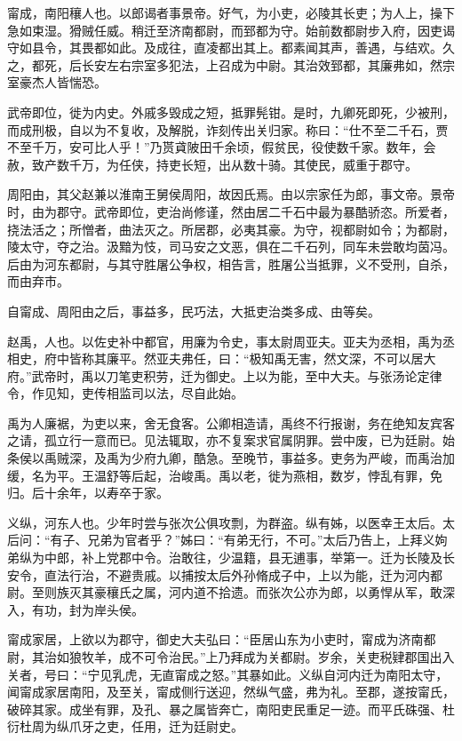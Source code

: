\documentclass[12pt,UTF8]{ctexbook}
\begin{document}
甯成，南阳穰人也。以郎谒者事景帝。好气，为小吏，必陵其长吏；为人上，操下急如束湿。猾贼任威。稍迁至济南都尉，而郅都为守。始前数都尉步入府，因吏谒守如县令，其畏都如此。及成往，直凌都出其上。都素闻其声，善遇，与结欢。久之，都死，后长安左右宗室多犯法，上召成为中尉。其治效郅都，其廉弗如，然宗室豪杰人皆惴恐。



武帝即位，徙为内史。外戚多毁成之短，抵罪髡钳。是时，九卿死即死，少被刑，而成刑极，自以为不复收，及解脱，诈刻传出关归家。称曰：“仕不至二千石，贾不至千万，安可比人乎！”乃贳貣陂田千余顷，假贫民，役使数千家。数年，会赦，致产数千万，为任侠，持吏长短，出从数十骑。其使民，威重于郡守。



周阳由，其父赵兼以淮南王舅侯周阳，故因氏焉。由以宗家任为郎，事文帝。景帝时，由为郡守。武帝即位，吏治尚修谨，然由居二千石中最为暴酷骄恣。所爱者，挠法活之；所憎者，曲法灭之。所居郡，必夷其豪。为守，视都尉如令；为都尉，陵太守，夺之治。汲黯为忮，司马安之文恶，俱在二千石列，同车未尝敢均茵冯。后由为河东都尉，与其守胜屠公争权，相告言，胜屠公当抵罪，义不受刑，自杀，而由弃市。



自甯成、周阳由之后，事益多，民巧法，大抵吏治类多成、由等矣。



赵禹，人也。以佐史补中都官，用廉为令史，事太尉周亚夫。亚夫为丞相，禹为丞相史，府中皆称其廉平。然亚夫弗任，曰：“极知禹无害，然文深，不可以居大府。”武帝时，禹以刀笔吏积劳，迁为御史。上以为能，至中大夫。与张汤论定律令，作见知，吏传相监司以法，尽自此始。



禹为人廉裾，为吏以来，舍无食客。公卿相造请，禹终不行报谢，务在绝知友宾客之请，孤立行一意而已。见法辄取，亦不复案求官属阴罪。尝中废，已为廷尉。始条侯以禹贼深，及禹为少府九卿，酷急。至晚节，事益多。吏务为严峻，而禹治加缓，名为平。王温舒等后起，治峻禹。禹以老，徙为燕相，数岁，悖乱有罪，免归。后十余年，以寿卒于家。



义纵，河东人也。少年时尝与张次公俱攻剽，为群盗。纵有姊，以医幸王太后。太后问：“有子、兄弟为官者乎？”姊曰：“有弟无行，不可。”太后乃告上，上拜义姁弟纵为中郎，补上党郡中令。治敢往，少温籍，县无逋事，举第一。迁为长陵及长安令，直法行治，不避贵戚。以捕按太后外孙脩成子中，上以为能，迁为河内都尉。至则族灭其豪穰氏之属，河内道不拾遗。而张次公亦为郎，以勇悍从军，敢深入，有功，封为岸头侯。



甯成家居，上欲以为郡守，御史大夫弘曰：“臣居山东为小吏时，甯成为济南都尉，其治如狼牧羊，成不可令治民。”上乃拜成为关都尉。岁余，关吏税肄郡国出入关者，号曰：“宁见乳虎，无直甯成之怒。”其暴如此。义纵自河内迁为南阳太守，闻甯成家居南阳，及至关，甯成侧行送迎，然纵气盛，弗为礼。至郡，遂按甯氏，破碎其家。成坐有罪，及孔、暴之属皆奔亡，南阳吏民重足一迹。而平氏硃强、杜衍杜周为纵爪牙之吏，任用，迁为廷尉史。
\end{document}
